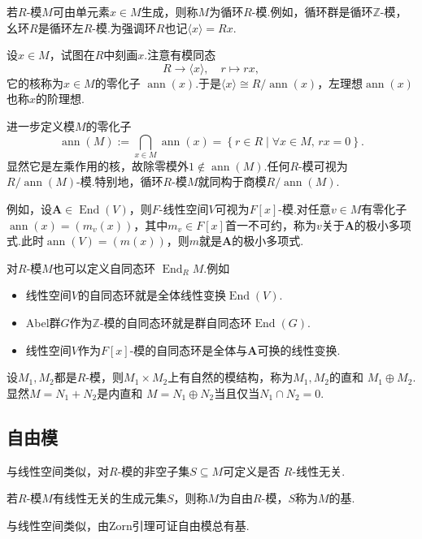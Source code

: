 若$R$-模$M$可由单元素$x\in M$生成，则称$M$为{\heiti 循环$R$-模}.例如，循环群是循环$\mathbb{Z}$-模，幺环$R$是循环左$R$-模.为强调环$R$也记$\langle x\rangle=Rx$.

设$x\in M$，试图在$R$中刻画$x$.注意有模同态
\[
    R\to\langle x\rangle,\quad r\mapsto rx,
\]
它的核称为$x\in M$的{\heiti 零化子} $\operatorname*{ann}(x)$.于是$\langle x\rangle\cong R/\operatorname*{ann}(x)$，左理想$\operatorname*{ann}(x)$也称$x$的{\heiti 阶理想}.

进一步定义模$M$的{\heiti 零化子}
\[
    \operatorname*{ann}(M):=\bigcap_{x\in M}\operatorname*{ann}(x)=\left\{r\in R\mid \forall x\in M,\,rx=0\right\}.
\]
显然它是左乘作用的核，故除零模外$1\notin\operatorname*{ann}(M)$.任何$R$-模可视为$R/\operatorname*{ann}(M)$-模.特别地，循环$R$-模$M$就同构于商模$R/\operatorname*{ann}(M)$.
\begin{remark}
    例如，设$\bm A\in\operatorname*{End}(V)$，则$F$-线性空间$V$可视为$F[x]$-模.对任意$v\in M$有零化子$\operatorname*{ann}(x)=(m_v(x))$，其中$m_v\in F[x]$首一不可约，称为$v$关于$\bm A$的{\heiti 极小多项式}.此时$\operatorname*{ann}(V)=(m(x))$，则$m$就是$\bm A$的{\heiti 极小多项式}.
\end{remark}

对$R$-模$M$也可以定义{\heiti 自同态环} $\operatorname*{End}_RM$.例如
\begin{itemize}
    \item 线性空间$V$的自同态环就是全体线性变换$\operatorname*{End}(V)$.
    \item Abel群$G$作为$\mathbb{Z}$-模的自同态环就是群自同态环$\operatorname*{End}(G)$.
    \item 线性空间$V$作为$F[x]$-模的自同态环是全体与$\bm A$可换的线性变换.
\end{itemize}

设$M_1,M_2$都是$R$-模，则$M_1\times M_2$上有自然的模结构，称为$M_1,M_2$的{\heiti 直和} $M_1\oplus M_2$.显然$M=N_1+N_2$是{\heiti 内直和} $M=N_1\oplus N_2$当且仅当$N_1\cap N_2=0$.

\subsection{自由模}
与线性空间类似，对$R$-模的非空子集$S\subseteq M$可定义是否 {\heiti $R$-线性无关}.

\begin{definition}
    若$R$-模$M$有线性无关的生成元集$S$，则称$M$为{\heiti 自由$R$-模}，$S$称为$M$的{\heiti 基}.
\end{definition}
\begin{remark}
    与线性空间类似，由Zorn引理可证自由模总有基.
\end{remark}


